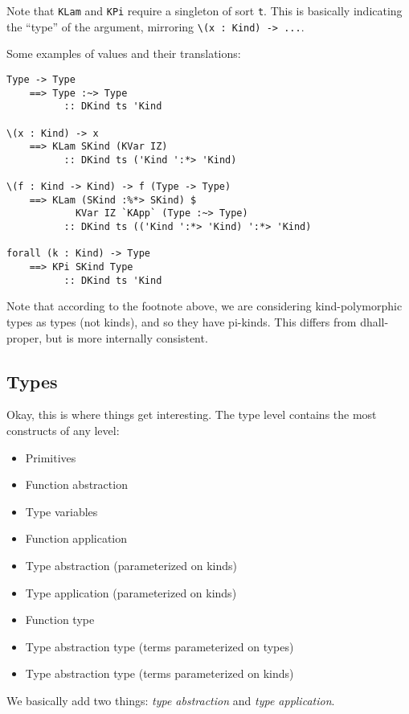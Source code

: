 \documentclass[]{article}
\begin{document}
Note that \texttt{KLam} and \texttt{KPi} require a singleton of sort \texttt{t}.
This is basically indicating the ``type'' of the argument, mirroring
\texttt{\textbackslash{}(x\ :\ Kind)\ -\textgreater{}\ ...}.

Some examples of values and their translations:

\begin{verbatim}
Type -> Type
    ==> Type :~> Type
          :: DKind ts 'Kind

\(x : Kind) -> x
    ==> KLam SKind (KVar IZ)
          :: DKind ts ('Kind ':*> 'Kind)

\(f : Kind -> Kind) -> f (Type -> Type)
    ==> KLam (SKind :%*> SKind) $
            KVar IZ `KApp` (Type :~> Type)
          :: DKind ts (('Kind ':*> 'Kind) ':*> 'Kind)

forall (k : Kind) -> Type
    ==> KPi SKind Type
          :: DKind ts 'Kind
\end{verbatim}

Note that according to the footnote above, we are considering kind-polymorphic
types as types (not kinds), and so they have pi-kinds. This differs from
dhall-proper, but is more internally consistent.

\hypertarget{types}{%
\subsection{Types}\label{types}}

Okay, this is where things get interesting. The type level contains the most
constructs of any level:

\begin{itemize}
\tightlist
\item
  Primitives
\item
  Function abstraction
\item
  Type variables
\item
  Function application
\item
  Type abstraction (parameterized on kinds)
\item
  Type application (parameterized on kinds)
\item
  Function type
\item
  Type abstraction type (terms parameterized on types)
\item
  Type abstraction type (terms parameterized on kinds)
\end{itemize}

We basically add two things: \emph{type abstraction} and \emph{type
application}.
\end{document}
